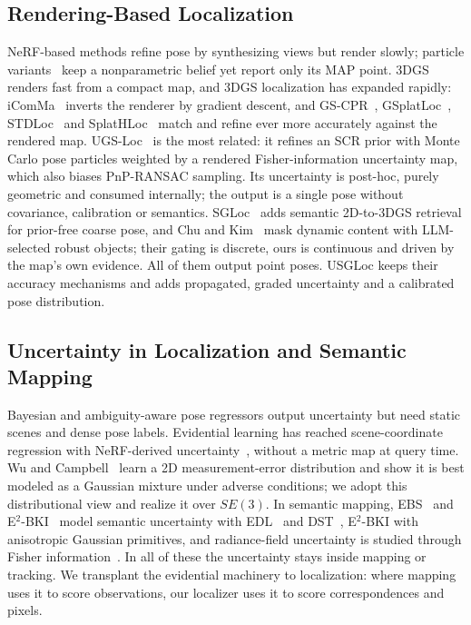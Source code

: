\documentclass[journal]{IEEEtran}
\newcommand{\method}{USGLoc}
\begin{document}
\subsection{Rendering-Based Localization}
NeRF-based methods refine pose by synthesizing views but render slowly; particle variants~\cite{locnerf} keep a nonparametric belief yet report only its MAP point. 3DGS~\cite{kerbl3dgs} renders fast from a compact map, and 3DGS localization has expanded rapidly: iComMa~\cite{icomma} inverts the renderer by gradient descent, and GS-CPR~\cite{gscpr}, GSplatLoc~\cite{gsplatloc}, STDLoc~\cite{stdloc} and SplatHLoc~\cite{splathloc} match and refine ever more accurately against the rendered map. UGS-Loc~\cite{ugsloc} is the most related: it refines an SCR prior with Monte Carlo pose particles weighted by a rendered Fisher-information uncertainty map, which also biases PnP-RANSAC sampling. Its uncertainty is post-hoc, purely geometric and consumed internally; the output is a single pose without covariance, calibration or semantics. SGLoc~\cite{sgloc} adds semantic 2D-to-3DGS retrieval for prior-free coarse pose, and Chu and Kim~\cite{chukim} mask dynamic content with LLM-selected robust objects; their gating is discrete, ours is continuous and driven by the map's own evidence. All of them output point poses. \method{} keeps their accuracy mechanisms and adds propagated, graded uncertainty and a calibrated pose distribution.

\subsection{Uncertainty in Localization and Semantic Mapping}
Bayesian and ambiguity-aware pose regressors output uncertainty but need static scenes and dense pose labels. Evidential learning has reached scene-coordinate regression with NeRF-derived uncertainty~\cite{chen2024edlscr}, without a metric map at query time. Wu and Campbell~\cite{ksenet} learn a 2D measurement-error distribution and show it is best modeled as a Gaussian mixture under adverse conditions; we adopt this distributional view and realize it over $SE(3)$. In semantic mapping, EBS~\cite{ebs} and E$^2$-BKI~\cite{e2bki} model semantic uncertainty with EDL~\cite{edl} and DST~\cite{dst}, E$^2$-BKI with anisotropic Gaussian primitives, and radiance-field uncertainty is studied through Fisher information~\cite{fisherrf}. In all of these the uncertainty stays inside mapping or tracking. We transplant the evidential machinery to localization: where mapping uses it to score observations, our localizer uses it to score correspondences and pixels.
\end{document}
